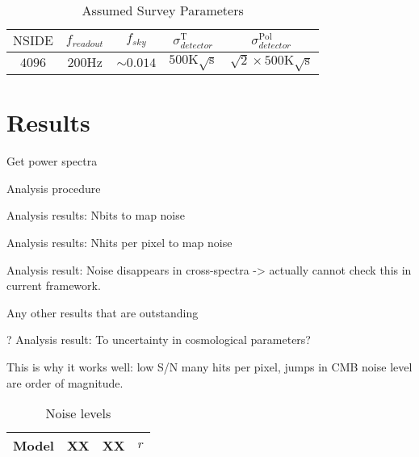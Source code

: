 \documentclass[apj]{emulateapj}
\begin{document}
\begin{table}[tbh]
\begin{center}
\caption{\label{tab:modelparams} Assumed Survey Parameters}
\small
\begin{tabular}{c c c c c}
$\mathrm{NSIDE}$ & $f_{readout}$ & $f_{sky}$ & $\sigma^{\mathrm{T}}_{detector}$ & $\sigma^{\mathrm{Pol}}_{detector}$\\
\hline
$4096$ & $200\mathrm{Hz}$ & $\sim 0.014$ & $500\mathrm{K}\sqrt{\mathrm{s}}$ & $\sqrt{2}\times500\mathrm{K}\sqrt{\mathrm{s}}$\\

\end{tabular}
 \normalsize
\end{center}
\end{table}






\section{Results}
\label{sec:results}

Get power spectra

Analysis procedure

Analysis results: Nbits to map noise

Analysis results: Nhits per pixel to map noise

Analysis result: Noise disappears in cross-spectra -> actually cannot check this in current framework.

Any other results that are outstanding

? Analysis result: To uncertainty in cosmological parameters?

This is why it works well: low S/N many hits per pixel, jumps in CMB noise level are order of magnitude.


\begin{table}[tbh]
\begin{center}
\caption{\label{tab:noise} Noise levels}
\small
\begin{tabular}{l | c c c }
Model   & XX&XX&$r$\\
\hline

\end{tabular}
 \normalsize
\end{center}
\end{table}
\end{document}
